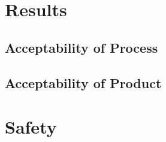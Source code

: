 \documentclass{../tex/report}
\begin{document}


\section{Results}

\subsection{Acceptability of Process}



\subsection{Acceptability of Product}



\section{Safety}



\clearpage



% 

\end{document}
